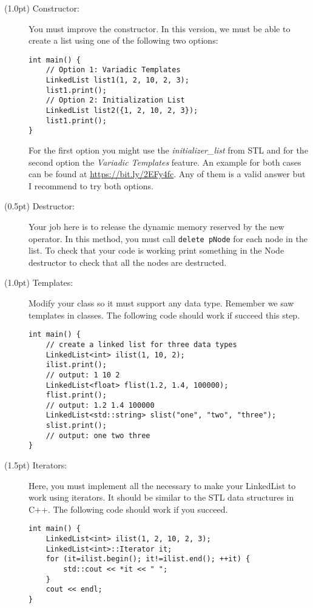 \documentclass{article}
\begin{document}
\begin{description}
  \item[(1.0pt) Constructor:] You must improve the constructor. In this version, we must be able to create a list using one of the following two options:
  
\begin{lstlisting}
int main() {
    // Option 1: Variadic Templates
    LinkedList list1(1, 2, 10, 2, 3);
    list1.print();
    // Option 2: Initialization List
    LinkedList list2({1, 2, 10, 2, 3});
    list1.print();
}
\end{lstlisting}

 For the first option you might use the \emph{initializer\_list} from STL and for the second option the \emph{Variadic Templates} feature. An example for both cases can be found at \url{https://bit.ly/2EFy4fc}. Any of them is a valid answer but I recommend to try both options. 
  
  \item[(0.5pt) Destructor:] Your job here is to release the dynamic memory reserved by the new operator. In this method, you must call \lstinline|delete pNode| for each node in the list. To check that your code is working print something in the Node destructor to check that all the nodes are destructed.
  
  \item[(1.0pt) Templates:] Modify your class so it must support any data type. Remember we saw templates in classes. The following code should work if succeed this step.
  
\begin{lstlisting}
int main() {
    // create a linked list for three data types
    LinkedList<int> ilist(1, 10, 2);
    ilist.print();
    // output: 1 10 2 
    LinkedList<float> flist(1.2, 1.4, 100000);
    flist.print();
    // output: 1.2 1.4 100000 
    LinkedList<std::string> slist("one", "two", "three");
    slist.print();
    // output: one two three 
}
\end{lstlisting}
  
  \item[(1.5pt) Iterators:] Here, you must implement all the necessary to make your LinkedList to work using iterators. It should be similar to the STL data structures in C++. The following code should work if you succeed.
  
\begin{lstlisting}
int main() {
    LinkedList<int> ilist(1, 2, 10, 2, 3);
    LinkedList<int>::Iterator it;
    for (it=ilist.begin(); it!=ilist.end(); ++it) {
        std::cout << *it << " ";
    }
    cout << endl;
}
\end{lstlisting}


\end{description}
\end{document}
